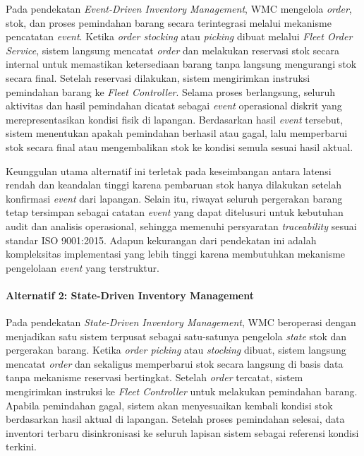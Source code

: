 Pada pendekatan \textit{Event-Driven Inventory Management}, WMC mengelola \textit{order}, stok, dan proses pemindahan barang secara terintegrasi melalui mekanisme pencatatan \textit{event}. Ketika \textit{order stocking} atau \textit{picking} dibuat melalui \textit{Fleet Order Service}, sistem langsung mencatat \textit{order} dan melakukan reservasi stok secara internal untuk memastikan ketersediaan barang tanpa langsung mengurangi stok secara final. Setelah reservasi dilakukan, sistem mengirimkan instruksi pemindahan barang ke \textit{Fleet Controller}. Selama proses berlangsung, seluruh aktivitas dan hasil pemindahan dicatat sebagai \textit{event} operasional diskrit yang merepresentasikan kondisi fisik di lapangan. Berdasarkan hasil \textit{event} tersebut, sistem menentukan apakah pemindahan berhasil atau gagal, lalu memperbarui stok secara final atau mengembalikan stok ke kondisi semula sesuai hasil aktual.

Keunggulan utama alternatif ini terletak pada keseimbangan antara latensi rendah dan keandalan tinggi karena pembaruan stok hanya dilakukan setelah konfirmasi \textit{event} dari lapangan. Selain itu, riwayat seluruh pergerakan barang tetap tersimpan sebagai catatan \textit{event} yang dapat ditelusuri untuk kebutuhan audit dan analisis operasional, sehingga memenuhi persyaratan \textit{traceability} sesuai standar ISO 9001:2015. Adapun kekurangan dari pendekatan ini adalah kompleksitas implementasi yang lebih tinggi karena membutuhkan mekanisme pengelolaan \textit{event} yang terstruktur.

\paragraph{Alternatif 2: State-Driven Inventory Management}

Pada pendekatan \textit{State-Driven Inventory Management}, WMC beroperasi dengan menjadikan satu sistem terpusat sebagai satu-satunya pengelola \textit{state} stok dan pergerakan barang. Ketika \textit{order picking} atau \textit{stocking} dibuat, sistem langsung mencatat \textit{order} dan sekaligus memperbarui stok secara langsung di basis data tanpa mekanisme reservasi bertingkat. Setelah \textit{order} tercatat, sistem mengirimkan instruksi ke \textit{Fleet Controller} untuk melakukan pemindahan barang. Apabila pemindahan gagal, sistem akan menyesuaikan kembali kondisi stok berdasarkan hasil aktual di lapangan. Setelah proses pemindahan selesai, data inventori terbaru disinkronisasi ke seluruh lapisan sistem sebagai referensi kondisi terkini.

